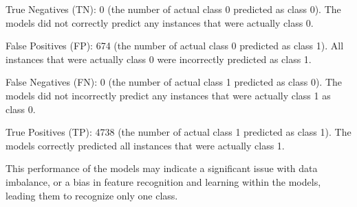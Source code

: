 \documentclass[
]{article}
\begin{document}
True Negatives (TN): 0 (the number of actual class 0 predicted as class
0). The models did not correctly predict any instances that were
actually class 0.

False Positives (FP): 674 (the number of actual class 0 predicted as
class 1). All instances that were actually class 0 were incorrectly
predicted as class 1.

False Negatives (FN): 0 (the number of actual class 1 predicted as class
0). The models did not incorrectly predict any instances that were
actually class 1 as class 0.

True Positives (TP): 4738 (the number of actual class 1 predicted as
class 1). The models correctly predicted all instances that were
actually class 1.

This performance of the models may indicate a significant issue with
data imbalance, or a bias in feature recognition and learning within the
models, leading them to recognize only one class.
\end{document}
